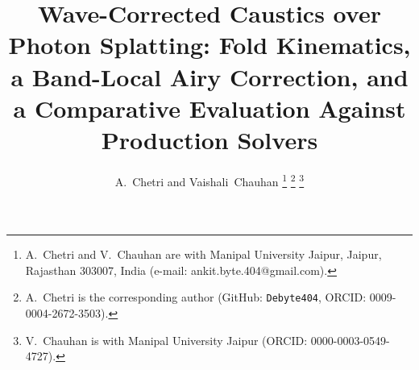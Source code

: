 \title{Wave-Corrected Caustics over Photon Splatting: Fold Kinematics,
a Band-Local Airy Correction, and a Comparative Evaluation Against
Production Solvers}

\author{A.~Chetri and Vaishali~Chauhan%
\thanks{A.~Chetri and V.~Chauhan are with Manipal University Jaipur, Jaipur, Rajasthan 303007, India (e-mail: ankit.byte.404@gmail.com).}%
\thanks{A.~Chetri is the corresponding author (GitHub: \texttt{Debyte404}, ORCID: 0009-0004-2672-3503).}%
\thanks{V.~Chauhan is with Manipal University Jaipur (ORCID: 0000-0003-0549-4727).}%
}

\maketitle

